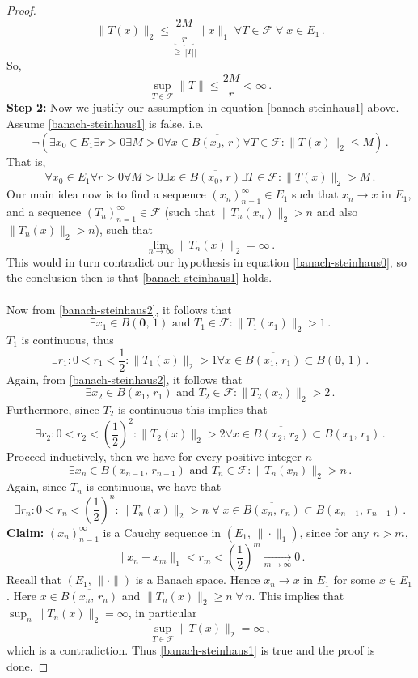 \documentclass[12pt, a4paper]{article}
\begin{document}
\begin{proof}
\[
\|T(x)\|_2\leq \underbrace{\dfrac{2M}{r}}_{\geq ||T||}\|x\|_1\;\forall T\in\mathcal{F}\;\forall\; x\in E_1\,.
\]
So,
\[
    \underset{T\in\mathcal{F}}{\operatorname{sup}}{\|T\|}\leq \dfrac{2M}{r}<\infty\,.
\]
\textbf{Step 2: }Now we justify our assumption in equation \eqref{banach-steinhaus1} above. Assume \eqref{banach-steinhaus1} is false, i.e.
\[
    \neg (\exists x_0\in E_1\exists r>0\exists M>0\forall x\in\overline{B(x_0,\,r)}\forall T\in\mathcal{F}:\|T(x)\|_2\leq M)\,.
\]
That is,
\begin{equation}
    \forall x_0\in E_1\forall r>0\forall M>0\exists x\in\overline{B(x_0,\,r)}\exists T\in\mathcal{F}:\|T(x)\|_2>M\,.
\label{banach-steinhaus2}
\end{equation}
Our main idea now is to find a sequence $(x_n)_{n=1}^\infty\in E_1$ such that $x_n\to x$ in $E_1$, and a sequence $(T_n)_{n=1}^\infty\in\mathcal{F}$ (such that $\|T_n(x_n)\|_2>n$ and also $\|T_n(x)\|_2>n$), such that
\[
    \lim_{n\to\infty} \|T_n(x)\|_2=\infty\,.
\]
This would in turn contradict our hypothesis in equation \eqref{banach-steinhaus0}, so the conclusion then is that \eqref{banach-steinhaus1} holds.
\\\\
Now from \eqref{banach-steinhaus2}, it follows that
\[
    \exists x_1\in B(\mathbf{0},\,1)\text{ and }T_1\in\mathcal{F}:\|T_1(x_1)\|_2>1\,.
\]
$T_1$ is continuous, thus
\[
    \exists r_1:0<r_1<\dfrac{1}{2}:\|T_1(x)\|_2>1\forall x\in \overline{B(x_1,\,r_1)}\subset B(\mathbf{0},\,1)\,.
\]
Again, from \eqref{banach-steinhaus2}, it follows that
\[
    \exists x_2\in B(x_1,\,r_1)\text{ and }T_2\in\mathcal{F}:\|T_2(x_2)\|_2>2\,.
\]
Furthermore, since $T_2$ is continuous this implies that
\[
    \exists r_2:0<r_2<\left(\dfrac{1}{2}\right)^2:\|T_2(x)\|_2>2\forall x\in \overline{B(x_2,\,r_2)}\subset B(x_1,\,r_1)\,.
\]
Proceed inductively, then we have for every positive integer $n$
\[
    \exists x_n\in B(x_{n-1},\,r_{n-1})\text{ and }T_n\in\mathcal{F}:\|T_n(x_n)\|_2>n\,.
\]
Again, since $T_n$ is continuous, we have that
\[
    \exists r_n:0<r_n<\left(\dfrac{1}{2}\right)^n:\|T_n(x)\|_2>n\;\forall \;x\in \overline{B(x_n,\,r_n)}\subset B(x_{n-1},\,r_{n-1})\,.
\]
\textbf{Claim:} $(x_n)_{n=1}^\infty$ is a Cauchy sequence in $(E_1,\,\|\cdot\|_1)$, since for any $n>m$,
\[
    \|x_n-x_m\|_1<r_m<\left(\dfrac{1}{2}\right)^m\underset{m\to\infty}{\longrightarrow}0\,.
\]
Recall that $(E_1,\,\|\cdot\|)$ is a Banach space. Hence $x_n\to x$ in $E_1$ for some $x\in E_1$. Here $x\in\overline{B(x_n,\,r_n)}$ and $\|T_n(x)\|_2\geq n \; \forall \, n$. This implies that $\sup_n\|T_n(x)\|_2=\infty$, in particular
\[
    \underset{T\in\mathcal{F}}{\operatorname{sup}}\|T(x)\|_2=\infty\,,
\]
which is a contradiction. Thus \eqref{banach-steinhaus1} is true and the proof is done.
\end{proof}
\end{document}
